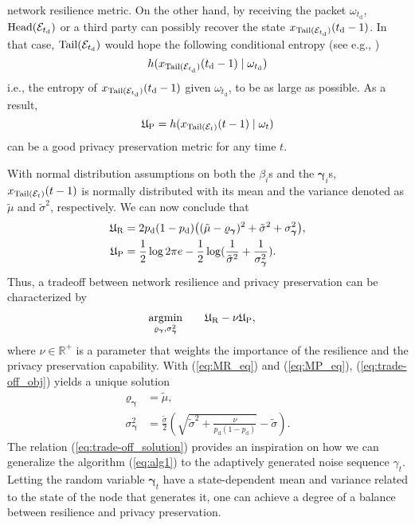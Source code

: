 \documentclass[a4paper, 11pt]{article}
\newcommand{\R}{\mathbb{R}}
\newcommand{\1}{\mathbf{1}}
\DeclareMathOperator*{\argmin}{argmin}
\newcommand{\asf}{\mathcal{E}}
\newcommand{\Head}{\textnormal{Head}}
\newcommand{\Tail}{\textnormal{Tail}}
\newcommand{\tdropout}{t_{\mathrm d}}
\newcommand{\pdropout}{p_{\mathrm d}}
\newcommand{\gammab}{{\bm \gamma}}
\begin{document}
network resilience metric. On the other hand,  by receiving the packet $\omega_{\tdropout}$, $\Head(\asf_{\tdropout})$ or a third party can possibly recover the state $x_{\Tail(\asf_{\tdropout})}({\tdropout}-1)$. In that case,  $\Tail(\asf_{\tdropout})$ would hope the following conditional entropy (see e.g., \cite{cover2012})   $$h(x_{\Tail(\asf_{\tdropout})}({\tdropout}-1)\mid\omega_{\tdropout})$$
i.e., the entropy of $x_{\Tail(\asf_{\tdropout})}({\tdropout}-1)$ given  $\omega_{\tdropout}$,
to be as large as possible. As a result,  $$\mathfrak{U}_{\rm P}=h(x_{\Tail(\asf_t)}(t-1)\mid\omega_t)$$
can be a good privacy preservation metric for any time $t$.

With normal distribution assumptions on both the $\beta_i$s and the $\gammab_i$s, $x_{\Tail(\asf_t)}(t-1)$ is normally distributed with its mean and the variance denoted as $\tilde{\mu}$ and $\tilde{\sigma}^2$, respectively. We can now conclude that
\begin{align}
\mathfrak{U}_{\rm R} &= 2\pdropout(1-\pdropout)\big((\tilde{\mu}-\varrho_\gammab)^2 + \tilde{\sigma}^2 + \sigma_{\gammab}^2\big)\label{eq:MR_eq},\\
\mathfrak{U}_{\rm P} &= \frac{1}{2}\log 2\pi e-\frac{1}{2}\log(\frac{1}{\tilde{\sigma}^2}+\frac{1}{\sigma_\gammab^2}).\label{eq:MP_eq}
\end{align}
Thus, a tradeoff between network resilience and privacy preservation can be characterized by
\begin{equation}\label{eq:trade-off_obj}
\begin{aligned}
\argmin_{\varrho_\gammab,\sigma_\gammab^2}\qquad &  \mathfrak{U}_{\rm R} - \nu \mathfrak{U}_{\rm P},
\end{aligned}
\end{equation}
where $\nu\in\R^{+}$ is a parameter that weights the importance of the resilience and the privacy preservation capability. With (\ref{eq:MR_eq}) and (\ref{eq:MP_eq}),  (\ref{eq:trade-off_obj}) yields a unique solution
\begin{equation}\label{eq:trade-off_solution}
\begin{aligned}
\varrho_\gammab &= \tilde{\mu},\\
\sigma_\gammab^2 &= \frac{\tilde{\sigma}}{2}(\sqrt{\tilde{\sigma}^2+\frac{\nu}{\pdropout(1-\pdropout)}}-\tilde{\sigma}).
\end{aligned}
\end{equation}
The relation (\ref{eq:trade-off_solution}) provides an inspiration on how we can generalize the algorithm (\ref{eq:alg1}) to the adaptively generated noise sequence  $\gamma_{t}$.  Letting the random variable $\gammab_t$ have a state-dependent mean and variance related  to the state of the node that generates it, one can achieve a degree of a balance between resilience and privacy preservation.
\end{document}
